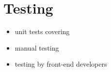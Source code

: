 \chapter{Testing}
\begin{itemize}
	\item unit tests covering
	\item manual testing
	\item testing by front-end developers
\end{itemize}